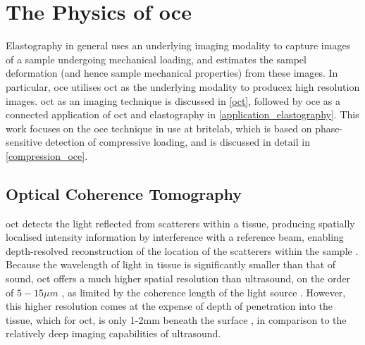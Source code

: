 \chapter{The Physics of \ac{oce}}\label{oce}

Elastography in general uses an underlying imaging modality to capture images of a sample undergoing mechanical loading, and estimates the sampel deformation (and hence sample mechanical properties) from these images. In particular, \ac{oce} utilises \ac{oct} as the underlying modality to producex high resolution images. \ac{oct} as an imaging technique is discussed in \autoref{oct}, followed by \ac{oce} as a connected application of \ac{oct} and elastography in \autoref{application_elastography}. 
This work focuses on the \ac{oce} technique in use at \ac{britelab}, which is based on phase-sensitive detection of compressive loading, and is discussed in detail in \autoref{compression_oce}.

\section{Optical Coherence Tomography}\label{oct}
\ac{oct} detects the light reflected from scatterers within a tissue, producing spatially localised intensity information by interference with a reference beam, enabling depth-resolved reconstruction of the location of the scatterers within the sample \cite{chin_parametric_2016}. Because the wavelength of light in tissue is significantly smaller than that of sound, \ac{oct} offers a much higher spatial resolution than ultrasound, on the order of $5-15 \mu m$ \cite{kennedy_emergence_2017}, as limited by the coherence length of the light source \cite{huang_optical_1991}. However, this higher resolution comes at the expense of depth of penetration into the tissue, which for \ac{oct}, is only 1-2mm beneath the surface \cite{schmitt_optical_1999}, in comparison to the relatively deep imaging capabilities of ultrasound.

